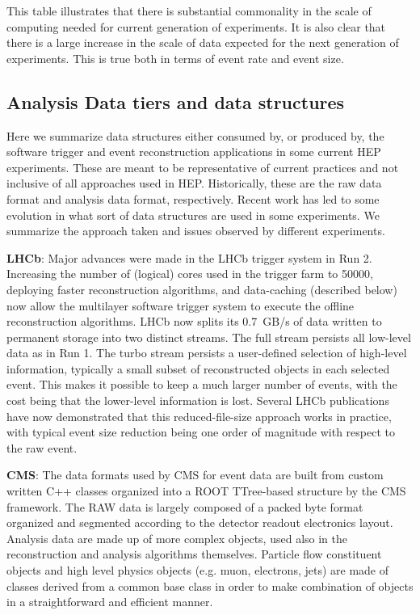 This table illustrates that there is substantial commonality in the scale of computing needed for current generation of experiments. It is also clear that there is a large increase 
in the scale of data expected for the next generation of experiments. This is true both in terms of event rate and event size.

\subsection{Analysis Data tiers and data structures}
Here we summarize data structures either consumed by, or produced by, the software trigger and event reconstruction applications in some current HEP experiments. These are meant to be 
representative of current practices and not inclusive of all approaches used in HEP. Historically, these are the raw data format and analysis data format, respectively. Recent work has 
led to some evolution in what sort of data structures are used in some experiments. We summarize the approach taken and issues observed by different experiments.

\vskip 0.5cm
\noindent
{\bf LHCb}: Major advances were made in the LHCb trigger system in Run 2. Increasing the number of (logical) cores used in the trigger farm to 50000, deploying faster reconstruction algorithms, 
and data-caching (described below) now allow the multilayer software trigger system to execute the offline reconstruction algorithms. LHCb now splits its 0.7~GB/s of data written to permanent 
storage into two distinct streams. The full stream persists all low-level data as in Run 1. The turbo stream persists a user-defined selection of high-level information, typically a small 
subset of reconstructed objects in each selected event. This makes it possible to keep a much larger number of events, with the cost being that the lower-level information is lost. 
Several LHCb publications have now demonstrated that this reduced-file-size approach works in practice, with typical event size reduction being one order of magnitude with respect to the raw event. 

\vskip 0.5cm
\noindent
{\bf CMS}: The data formats used by CMS for event data are built from custom written C++ classes organized into a ROOT TTree-based structure by the CMS framework. The RAW data is largely 
composed of a packed byte format organized and segmented according to the detector readout electronics layout. Analysis data are made up of more complex objects, used also in the 
reconstruction and analysis algorithms themselves. Particle flow constituent objects and high level physics objects (e.g. muon, electrons, jets) are made of classes derived from a 
common base class in order to make combination of objects in a straightforward and efficient manner.

